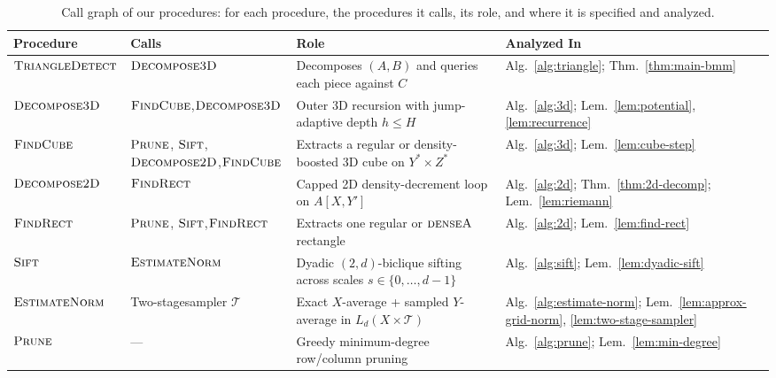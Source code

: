 \documentclass[11pt]{article}
\theoremstyle{definition}
\renewcommand{\label}[1]{}%
\newcommand{\Prune}{\textnormal{\textsc{Prune}}}
\newcommand{\EstimateNorm}{\textnormal{\textsc{EstimateNorm}}}
\newcommand{\Sift}{\textnormal{\textsc{Sift}}}
\newcommand{\FindRect}{\textnormal{\textsc{FindRect}}}
\newcommand{\DecomposeTwoD}{\textnormal{\textsc{Decompose2D}}}
\newcommand{\FindCube}{\textnormal{\textsc{FindCube}}}
\newcommand{\DecomposeThreeD}{\textnormal{\textsc{Decompose3D}}}
\newcommand{\TriangleDetect}{\textnormal{\textsc{TriangleDetect}}}
\newcommand{\tagdenseA}{\textnormal{\textsc{denseA}}}
\begin{document}
\begin{table}[t]
\centering
\footnotesize
\setlength{\tabcolsep}{5pt}
\renewcommand{\arraystretch}{1.18}
\begin{tabularx}{\textwidth}{@{}>{\raggedright\arraybackslash}p{}>{\raggedright\arraybackslash}p{}>{\raggedright\arraybackslash}X>{\raggedright\arraybackslash}p{}@{}}
\toprule
\textbf{Procedure} & \textbf{Calls} & \textbf{Role} & \textbf{Analyzed In} \\
\midrule
$\TriangleDetect$ & $\DecomposeThreeD$ & Decomposes $(A, B)$ and queries each piece against $C$ & Alg.~\ref{alg:triangle}; Thm.~\ref{thm:main-bmm} \\
$\DecomposeThreeD$ & $\FindCube$,\newline $\DecomposeThreeD$ & Outer 3D recursion with jump-adaptive depth $h \le H$ & Alg.~\ref{alg:3d}; Lem.~\ref{lem:potential}, \ref{lem:recurrence} \\
$\FindCube$ & $\Prune$, $\Sift$,\newline $\DecomposeTwoD$,\newline $\FindCube$ & Extracts a regular or density-boosted 3D cube on $Y^* \times Z^*$ & Alg.~\ref{alg:3d}; Lem.~\ref{lem:cube-step} \\
$\DecomposeTwoD$ & $\FindRect$ & Capped 2D density-decrement loop on $A[X, Y']$ & Alg.~\ref{alg:2d}; Thm.~\ref{thm:2d-decomp}; Lem.~\ref{lem:riemann} \\
$\FindRect$ & $\Prune$, $\Sift$,\newline $\FindRect$ & Extracts one regular or $\tagdenseA$ rectangle & Alg.~\ref{alg:2d}; Lem.~\ref{lem:find-rect} \\
$\Sift$ & $\EstimateNorm$ & Dyadic $(2, d)$-biclique sifting across scales $s \in \{0, \dots, d-1\}$ & Alg.~\ref{alg:sift}; Lem.~\ref{lem:dyadic-sift} \\
$\EstimateNorm$ & Two-stage\newline sampler $\mathcal{T}$ & Exact $X$-average + sampled $Y$-average in $L_d(X \times \mathcal{T})$ & Alg.~\ref{alg:estimate-norm}; Lem.~\ref{lem:approx-grid-norm}, \ref{lem:two-stage-sampler} \\
$\Prune$ & --- & Greedy minimum-degree row/column pruning & Alg.~\ref{alg:prune}; Lem.~\ref{lem:min-degree} \\
\bottomrule
\end{tabularx}
\caption{Call graph of our procedures: for each procedure, the procedures it calls, its role, and where it is specified and analyzed.}
\label{tab:call-graph}
\end{table}
\end{document}
